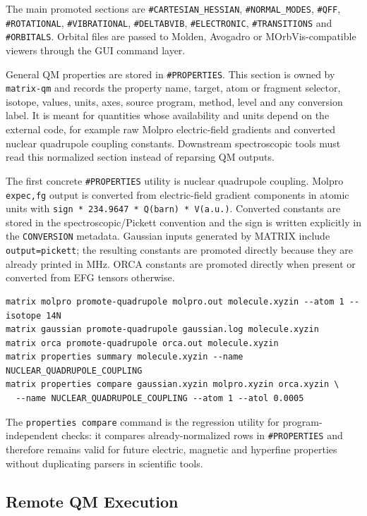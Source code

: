 \documentclass[11pt]{article}
\newcommand{\sectionname}[1]{\texttt{\##1}}
\begin{document}
The main promoted sections are \sectionname{CARTESIAN\_HESSIAN},
\sectionname{NORMAL\_MODES}, \sectionname{QFF}, \sectionname{ROTATIONAL},
\sectionname{VIBRATIONAL}, \sectionname{DELTABVIB},
\sectionname{ELECTRONIC}, \sectionname{TRANSITIONS} and
\sectionname{ORBITALS}.  Orbital files are passed to Molden, Avogadro or
MOrbVis-compatible viewers through the GUI command layer.

General QM properties are stored in \sectionname{PROPERTIES}.  This section is
owned by \texttt{matrix-qm} and records the property name, target, atom or
fragment selector, isotope, values, units, axes, source program, method, level
and any conversion label.  It is meant for quantities whose availability and
units depend on the external code, for example raw Molpro electric-field
gradients and converted nuclear quadrupole coupling constants.  Downstream
spectroscopic tools must read this normalized section instead of reparsing QM
outputs.

The first concrete \sectionname{PROPERTIES} utility is nuclear quadrupole
coupling.  Molpro \texttt{expec,fg} output is converted from electric-field
gradient components in atomic units with
\texttt{sign * 234.9647 * Q(barn) * V(a.u.)}.  Converted constants are stored
in the spectroscopic/Pickett convention and the sign is written explicitly in
the \texttt{CONVERSION} metadata.  Gaussian inputs generated by MATRIX include
\texttt{output=pickett}; the resulting constants are promoted directly because
they are already printed in MHz.  ORCA constants are promoted directly when
present or converted from EFG tensors otherwise.

\begin{lstlisting}[style=matrix]
matrix molpro promote-quadrupole molpro.out molecule.xyzin --atom 1 --isotope 14N
matrix gaussian promote-quadrupole gaussian.log molecule.xyzin
matrix orca promote-quadrupole orca.out molecule.xyzin
matrix properties summary molecule.xyzin --name NUCLEAR_QUADRUPOLE_COUPLING
matrix properties compare gaussian.xyzin molpro.xyzin orca.xyzin \
  --name NUCLEAR_QUADRUPOLE_COUPLING --atom 1 --atol 0.0005
\end{lstlisting}

The \texttt{properties compare} command is the regression utility for
program-independent checks: it compares already-normalized rows in
\sectionname{PROPERTIES} and therefore remains valid for future electric,
magnetic and hyperfine properties without duplicating parsers in scientific
tools.

\subsection{Remote QM Execution}
\end{document}
